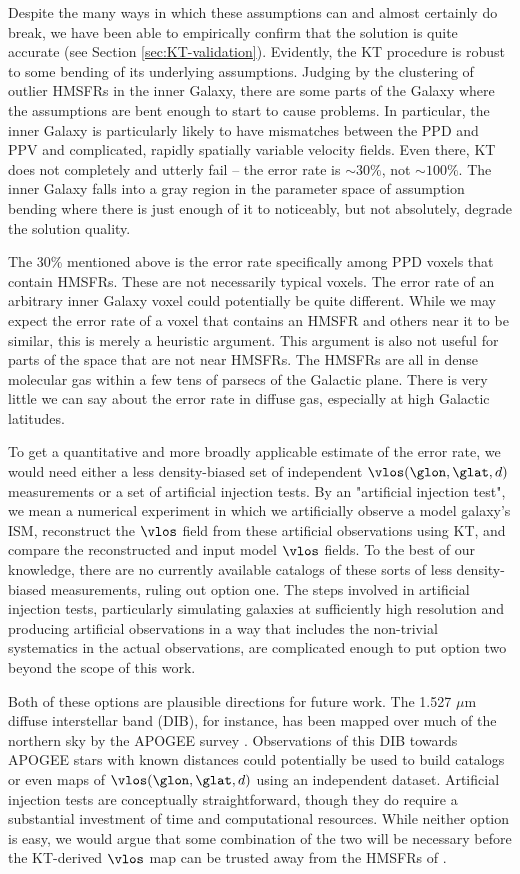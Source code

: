 Despite the many ways in which these assumptions can and almost certainly do break, we have been able to empirically confirm that the solution is quite accurate (see Section \ref{sec:KT-validation}). 
Evidently, the KT procedure is robust to some bending of its underlying assumptions.
Judging by the clustering of outlier HMSFRs in the inner Galaxy, there are some parts of the Galaxy where the assumptions are bent enough to start to cause problems.
In particular, the inner Galaxy is particularly likely to have mismatches between the PPD and PPV and complicated, rapidly spatially variable velocity fields.
Even there, KT does not completely and utterly fail -- the error rate is $\sim 30 \%$, not $\sim 100 \%$.
The inner Galaxy falls into a gray region in the parameter space of assumption bending where there is just enough of it to noticeably, but not absolutely, degrade the solution quality.

The 30\% mentioned above is the error rate specifically among PPD voxels that contain HMSFRs.
These are not necessarily typical voxels. 
The error rate of an arbitrary inner Galaxy voxel could potentially be quite different. 
While we may expect the error rate of a voxel that contains an HMSFR and others near it to be similar, this is merely a heuristic argument.
This argument is also not useful for parts of the space that are not near HMSFRs.
The HMSFRs are all in dense molecular gas within a few tens of parsecs of the Galactic plane. There is very little we can say about the error rate in diffuse gas, especially at high Galactic latitudes. 

To get a quantitative and more broadly applicable estimate of the error rate, we would need either a less density-biased set of independent $\vlos(\glon, \glat, d)$ measurements or a set of artificial injection tests. 
By an "artificial injection test", we mean a numerical experiment in which we artificially observe a model galaxy's ISM, reconstruct the $\vlos$ field from these artificial observations using KT, and compare the reconstructed and input model $\vlos$ fields. 
To the best of our knowledge, there are no currently available catalogs of these sorts of less density-biased measurements, ruling out option one.
The steps involved in artificial injection tests, particularly simulating galaxies at sufficiently high resolution and producing artificial observations in a way that includes the non-trivial systematics in the actual observations, are complicated enough to put option two beyond the scope of this work.

Both of these options are plausible directions for future work. 
The 1.527 $\mu$m diffuse interstellar band (DIB), for instance, has been mapped over much of the northern sky by the APOGEE survey \citep{2015ApJ...798...35Z}. 
Observations of this DIB towards APOGEE stars with known distances could potentially be used to build catalogs or even maps of $\vlos(\glon, \glat, d)$ using an independent dataset. 
Artificial injection tests are conceptually straightforward, though they do require a substantial investment of time and computational resources.
While neither option is easy, we would argue that some combination of the two will be necessary before the KT-derived $\vlos$ map can be trusted away from the HMSFRs of \Reid.
